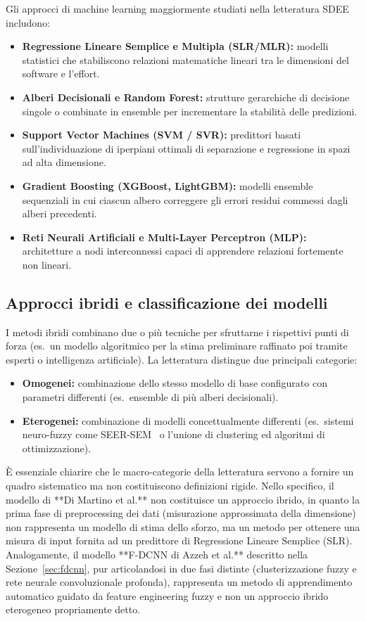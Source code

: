 \documentclass[11pt, a4paper]{article}
\begin{document}
Gli approcci di machine learning maggiormente studiati nella letteratura SDEE includono:
\begin{itemize}
    \item \textbf{Regressione Lineare Semplice e Multipla (SLR/MLR):} modelli statistici che stabiliscono relazioni matematiche lineari tra le dimensioni del software e l'effort.
    \item \textbf{Alberi Decisionali e Random Forest:} strutture gerarchiche di decisione singole o combinate in ensemble per incrementare la stabilità delle predizioni.
    \item \textbf{Support Vector Machines (SVM / SVR):} predittori basati sull'individuazione di iperpiani ottimali di separazione e regressione in spazi ad alta dimensione.
    \item \textbf{Gradient Boosting (XGBoost, LightGBM):} modelli ensemble sequenziali in cui ciascun albero correggere gli errori residui commessi dagli alberi precedenti.
    \item \textbf{Reti Neurali Artificiali e Multi-Layer Perceptron (MLP):} architetture a nodi interconnessi capaci di apprendere relazioni fortemente non lineari.
\end{itemize}

\subsection{Approcci ibridi e classificazione dei modelli}
I metodi ibridi combinano due o più tecniche per sfruttarne i rispettivi punti di forza (es.\ un modello algoritmico per la stima preliminare raffinato poi tramite esperti o intelligenza artificiale). La letteratura distingue due principali categorie:
\begin{itemize}
    \item \textbf{Omogenei:} combinazione dello stesso modello di base configurato con parametri differenti (es.\ ensemble di più alberi decisionali).
    \item \textbf{Eterogenei:} combinazione di modelli concettualmente differenti (es.\ sistemi neuro-fuzzy come SEER-SEM~\cite{DBLP:journals/corr/DuHC15a} o l'unione di clustering ed algoritmi di ottimizzazione).
\end{itemize}

È essenziale chiarire che le macro-categorie della letteratura servono a fornire un quadro sistematico ma non costituiscono definizioni rigide. Nello specifico, il modello di **Di Martino et al.** non costituisce un approccio ibrido, in quanto la prima fase di preprocessing dei dati (misurazione approssimata della dimensione) non rappresenta un modello di stima dello sforzo, ma un metodo per ottenere una misura di input fornita ad un predittore di Regressione Lineare Semplice (SLR). Analogamente, il modello **F-DCNN di Azzeh et al.** descritto nella Sezione~\ref{sec:fdcnn}, pur articolandosi in due fasi distinte (clusterizzazione fuzzy e rete neurale convoluzionale profonda), rappresenta un metodo di apprendimento automatico guidato da feature engineering fuzzy e non un approccio ibrido eterogeneo propriamente detto.
\end{document}
